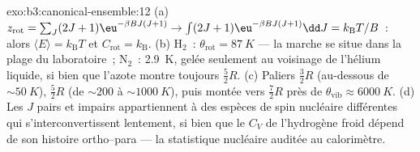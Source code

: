 \begin{solution}{exo:b3:canonical-ensemble:12}
(a) $z_{\text{rot}} = \sum_J(2J+1)\eu^{-\beta BJ(J+1)}
\to \int(2J+1)\eu^{-\beta BJ(J+1)}\dd J = k_{\text{B}}T/B$~: alors
$\langle E\rangle = k_{\text{B}}T$ et $C_{\text{rot}} =
k_{\text{B}}$. (b) H$_2$~: $\theta_{\text{rot}} = \qty{87}{K}$ ---
la marche se situe dans la plage du laboratoire~; N$_2$~:
\qty{2.9}{K}, gelée seulement au voisinage de l'hélium liquide, si
bien que l'azote montre toujours $\tfrac52 R$. (c) Paliers
$\tfrac32 R$ (au-dessous de $\sim\qty{50}{K}$), $\tfrac52 R$ (de
$\sim200$ à $\sim\qty{1000}{K}$), puis montée vers $\tfrac72 R$ près de
$\theta_{\text{vib}} \approx
\qty{6000}{K}$. (d) Les $J$ pairs et
impairs appartiennent à des espèces de spin nucléaire différentes qui
s'interconvertissent lentement, si bien que le $C_V$ de l'hydrogène
froid dépend de son histoire ortho--para --- la statistique nucléaire
auditée au calorimètre.
\end{solution}

